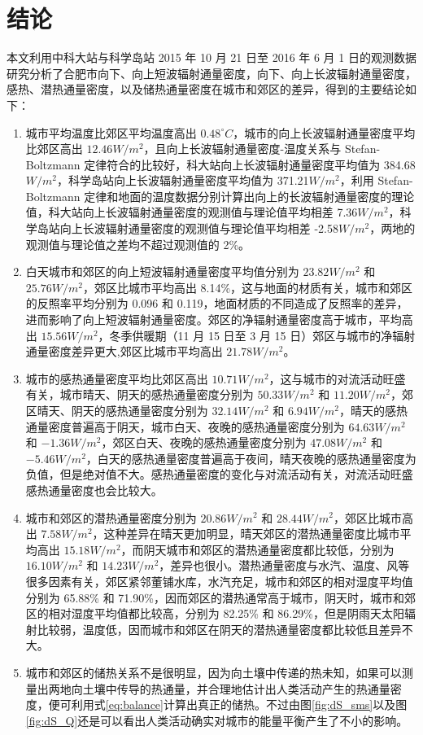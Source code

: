 \chapter{结论}
本文利用中科大站与科学岛站 2015 年 10 月 21 日至 2016 年 6 月 1 日的观测数据研究分析了合肥市向下、向上短波辐射通量密度，向下、向上长波辐射通量密度，感热、潜热通量密度，以及储热通量密度在城市和郊区的差异，得到的主要结论如下：
\begin{enumerate}
\item 城市平均温度比郊区平均温度高出 \(0.48^{\circ}C\)，城市的向上长波辐射通量密度平均比郊区高出 \(12.46W/m^2\)，且向上长波辐射通量密度-温度关系与 Stefan-Boltzmann 定律符合的比较好，科大站向上长波辐射通量密度平均值为 384.68\(W/m^2\)，科学岛站向上长波辐射通量密度平均值为 371.21\(W/m^2\)，利用 Stefan-Boltzmann 定律和地面的温度数据分别计算出向上的长波辐射通量密度的理论值，科大站向上长波辐射通量密度的观测值与理论值平均相差 7.36\(W/m^2\)，科学岛站向上长波辐射通量密度的观测值与理论值平均相差 -2.58\(W/m^2\)，两地的观测值与理论值之差均不超过观测值的 2\%。
\item 白天城市和郊区的向上短波辐射通量密度平均值分别为 \(23.82W/m^2\) 和 \(25.76W/m^2\)，郊区比城市平均高出 8.14\%，这与地面的材质有关，城市和郊区的反照率平均分别为 0.096 和 0.119，地面材质的不同造成了反照率的差异，进而影响了向上短波辐射通量密度。郊区的净辐射通量密度高于城市，平均高出 \(15.56W/m^2\)，冬季供暖期（11 月 15 日至 3 月 15 日）郊区与城市的净辐射通量密度差异更大,郊区比城市平均高出 \(21.78W/m^2\)。
\item 城市的感热通量密度平均比郊区高出 \(10.71W/m^2\)，这与城市的对流活动旺盛有关，城市晴天、阴天的感热通量密度分别为 \(50.33W/m^2\) 和 \(11.20W/m^2\)，郊区晴天、阴天的感热通量密度分别为 \(32.14W/m^2\) 和 \(6.94W/m^2\)，晴天的感热通量密度普遍高于阴天，城市白天、夜晚的感热通量密度分别为 \(64.63W/m^2\) 和 \(-1.36W/m^2\)，郊区白天、夜晚的感热通量密度分别为 \(47.08W/m^2\) 和 \(-5.46W/m^2\)，白天的感热通量密度普遍高于夜间，晴天夜晚的感热通量密度为负值，但是绝对值不大。感热通量密度的变化与对流活动有关，对流活动旺盛感热通量密度也会比较大。
\item 城市和郊区的潜热通量密度分别为 \(20.86W/m^2\) 和 \(28.44W/m^2\)，郊区比城市高出 \(7.58W/m^2\)，这种差异在晴天更加明显，晴天郊区的潜热通量密度比城市平均高出 \(15.18W/m^2\)，而阴天城市和郊区的潜热通量密度都比较低，分别为 \(16.10W/m^2\) 和 \(14.23W/m^2\)，差异也很小。潜热通量密度与水汽、温度、风等很多因素有关，郊区紧邻董铺水库，水汽充足，城市和郊区的相对湿度平均值分别为 65.88\% 和 71.90\%，因而郊区的潜热通常高于城市，阴天时，城市和郊区的相对湿度平均值都比较高，分别为 82.25\% 和 86.29\%，但是阴雨天太阳辐射比较弱，温度低，因而城市和郊区在阴天的潜热通量密度都比较低且差异不大。
\item 城市和郊区的储热关系不是很明显，因为向土壤中传递的热未知，如果可以测量出两地向土壤中传导的热通量，并合理地估计出人类活动产生的热通量密度，便可利用式\ref{eq:balance}计算出真正的储热。不过由图\ref{fig:dS_sms}以及图\ref{fig:dS_Q}还是可以看出人类活动确实对城市的能量平衡产生了不小的影响。
\end{enumerate}
